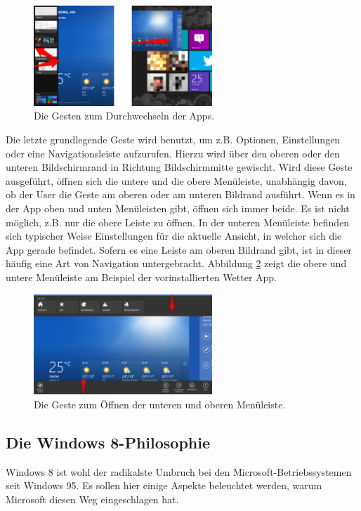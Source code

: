 \documentclass[12pt,a4paper,bibtotoc,abstracton]{scrartcl}
\begin{document}
\begin{figure}[h]	
	\centering
	\includegraphics[width=0.6\textwidth]{Bilder/Screenshots/windows8/apps_changing.png} 
	\caption{Die Gesten zum Durchwechseln der Apps.}
	\label{fig:appschanging}
\end{figure}  

Die letzte grundlegende Geste wird benutzt, um z.B. Optionen, Einstellungen oder eine Navigationsleiste aufzurufen. Hierzu wird über den oberen oder den unteren Bildschirmrand in Richtung Bildschirmmitte gewischt. Wird diese Geste ausgeführt, öffnen sich die untere und die obere Menüleiste, unabhängig davon, ob der User die Geste am oberen oder am unteren Bildrand ausführt. Wenn es in der App oben und unten Menüleisten gibt, öffnen sich immer beide. Es ist nicht möglich, z.B. nur die obere Leiste zu öffnen. In der unteren Menüleiste befinden sich typischer Weise Einstellungen für die aktuelle Ansicht, in welcher sich die App gerade befindet. Sofern es eine Leiste am oberen Bildrand gibt, ist in dieser häufig eine Art von Navigation untergebracht. Abbildung \ref{fig:menubar} zeigt die obere und untere Menüleiste am Beispiel der vorinstallierten Wetter App.

\begin{figure}[h]	
	\centering
	\includegraphics[width=0.6\textwidth]{Bilder/Screenshots/windows8/app_leisten.png} 
	\caption{Die Geste zum Öffnen der unteren und oberen Menüleiste.}
	\label{fig:menubar}
\end{figure}  

\subsection{Die Windows 8-Philosophie}
\label{subsec:win8philosophie}
Windows 8 ist wohl der radikalste Umbruch bei den Microsoft-Betriebssystemen seit Windows 95. Es sollen hier einige Aspekte beleuchtet werden, warum Microsoft diesen Weg eingeschlagen hat.
\end{document}

